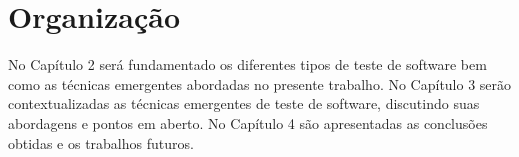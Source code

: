 \section{Organização}
\label{sec:organizacao}

No Capítulo 2 será fundamentado os diferentes tipos de teste de software bem como as técnicas emergentes abordadas no presente trabalho. No Capítulo 3 serão contextualizadas as técnicas emergentes de teste de software, discutindo suas abordagens e pontos em aberto. No Capítulo 4 são apresentadas as conclusões obtidas e os trabalhos futuros.